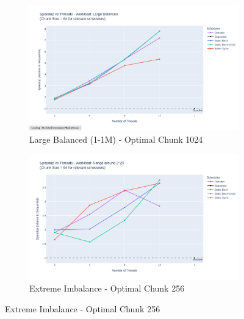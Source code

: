 \documentclass[10pt]{article}
\begin{document}
\begin{figure}[H]
    \centering
    \begin{subfigure}[b]{0.49\textwidth}
        \centering
        \includegraphics[width=\textwidth]{../results/plots/speedup_vs_threads/speedup_vs_threads_W1.pdf}
        \caption{Large Balanced (1-1M) - Optimal Chunk 1024}
        \label{fig:speedup_large_balanced}
    \end{subfigure}
    \hfill
    \begin{subfigure}[b]{0.49\textwidth}
        \centering
        \includegraphics[width=\textwidth]{../results/plots/speedup_vs_threads/speedup_vs_threads_W5.pdf}
        \caption{Extreme Imbalance - Optimal Chunk 256}
        \label{fig:speedup_extreme_imbalance}
    \end{subfigure}

    \vspace{1em}


\end{figure}
\end{document}
